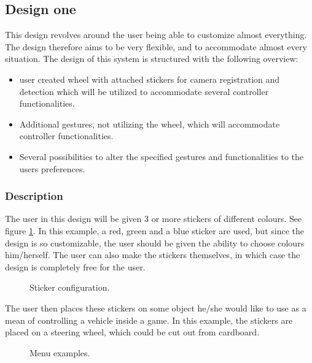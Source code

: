 \subsection{Design one}
\label{design1}
This design revolves around the user being able to customize almost everything. The design therefore aims to be very flexible, and to accommodate almost every situation. The design of this system is structured with the following overview:

\begin{itemize}
\item user created wheel with attached stickers for camera registration and detection which will be utilized to accommodate several controller functionalities.
\item Additional gestures, not utilizing the wheel, which will accommodate controller functionalities.
\item Several possibilities to alter the specified gestures and functionalities to the users preferences. 
\end{itemize}


\subsubsection*{Description}
The user in this design will be given 3 or more stickers of different colours. See figure \ref{fig:wheel}. In this example, a red, green and a blue sticker are used, but since the design is so customizable, the user should be given the ability to choose colours him/herself. The user can also make the stickers themselves, in which case the design is completely free for the user.


\begin{figure}[h]
\centering
{}
\caption{Sticker configuration.}\label{fig:wheel}
\end{figure}

The user then places these stickers on some object he/she would like to use as a mean of controlling a vehicle inside a game. In this example, the stickers are placed on a steering wheel, which could be cut out from cardboard.

\begin{figure}[h]
\centering
{}
\caption{Menu examples.}\label{fig:select}
\end{figure}

